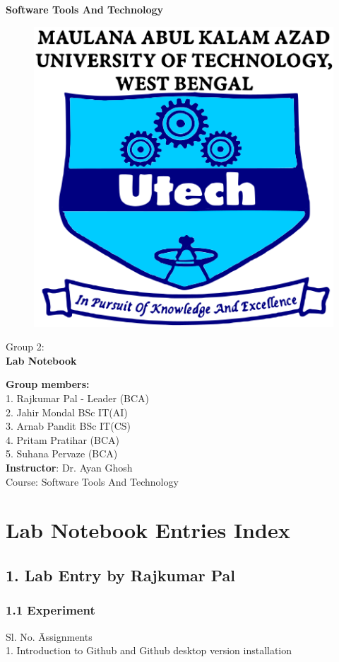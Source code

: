 \documentclass[a4paper,12pt]{article}
\begin{document}
\begin{center}
    \Large \textbf{Software Tools And Technology} \\[1cm]
\begin{figure}[h!]
   \centering
    \includegraphics[width=0.3\linewidth]{makaut logo.png}
\end{figure}
\vspace{0.5 cm}
    
    Group 2: \\[1cm]
    \textbf{Lab Notebook} \\[2cm]

    \vspace{0.1 cm}

    
    \textbf{Group members:} \\[0.5cm]
    1. Rajkumar Pal - Leader (BCA) \\[0.2cm]
    2. Jahir Mondal BSc IT(AI) \\[0.2cm]
    3. Arnab Pandit BSc IT(CS) \\[0.2cm]
    4. Pritam Pratihar (BCA) \\[0.2cm]
    5. Suhana Pervaze (BCA) \\[2cm]

    \textbf{Instructor}: Dr. Ayan Ghosh \\[0.5cm]
    Course: Software Tools And Technology
\end{center}

\section*{Lab Notebook Entries Index}

\subsection*{1. Lab Entry by Rajkumar Pal}
\subsubsection*{1.1 Experiment}
\begin{tabbing}
    Sl. No. \hspace{2cm} \= Assignments \\
    1. \> Introduction to Github and Github desktop version installation \\
\end{tabbing}
\end{document}

